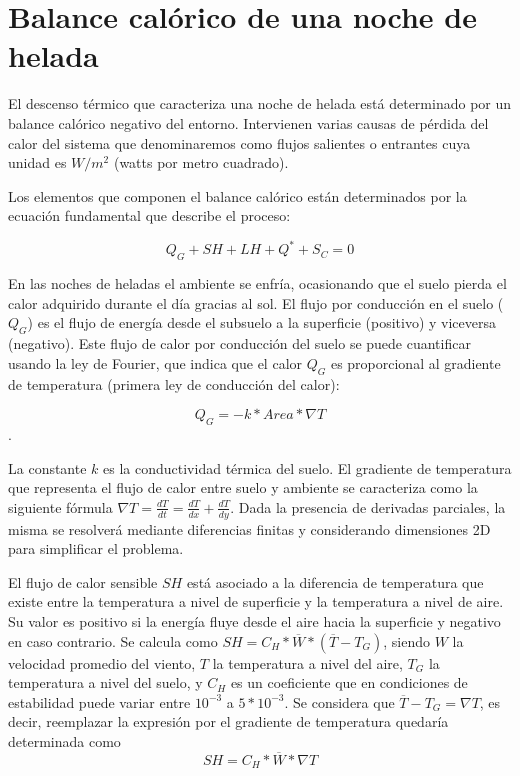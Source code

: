 \documentclass[final,a4paper]{llncs}
\begin{document}
\section{Balance calórico de una noche de helada}

 El descenso térmico que caracteriza una noche de helada está determinado por un balance calórico negativo
 del entorno. Intervienen varias causas de pérdida del calor del sistema que denominaremos como flujos salientes
 o entrantes cuya unidad es $W/m^2$ (watts por metro cuadrado).
 
 Los elementos que componen el balance calórico están determinados por la ecuación fundamental que describe 
 el proceso:
 
$$Q_G + SH + LH + Q^*+S_C=0$$

En las noches de heladas el ambiente se enfría, ocasionando que el suelo pierda el calor adquirido durante
el día gracias al sol. El flujo por conducción en el suelo ($Q_G$) es el flujo de energía desde el subsuelo a la superficie
(positivo) y viceversa (negativo). Este flujo de calor por conducción del suelo se puede cuantificar
usando la ley de Fourier, que indica que el calor $Q_G$ es proporcional al gradiente de temperatura
(primera ley de conducción del calor): 

$$Q_G=-k* Area * \nabla T $$. 

La constante $k$ es la conductividad térmica del suelo.
El gradiente de temperatura que representa el flujo de calor entre suelo y ambiente se caracteriza como la siguiente fórmula 
$\nabla T =\frac{dT}{dt}=\frac{dT}{dx}+\frac{dT}{dy}$. Dada la presencia de derivadas parciales, la misma se resolverá 
mediante diferencias finitas y considerando dimensiones 2D para simplificar el problema.


El flujo de calor sensible $SH$ está asociado a la diferencia de temperatura que existe entre la temperatura
a nivel de superficie y la temperatura a nivel de aire. Su valor es positivo si la energía fluye 
desde el aire hacia la superficie y negativo en caso contrario. Se calcula como 
$SH=C_H*\overline{W}*(\overline{T}-T_G)$, siendo
$W$ la velocidad promedio del viento, $T$ la temperatura a nivel del aire, 
$T_G$ la temperatura a nivel del suelo, y $C_H$ es un coeficiente que en condiciones de estabilidad
puede variar entre $10^{-3}$ a $5*10^{-3}$. Se considera que $\overline{T}-T_G = \nabla T $, es decir,
reemplazar la expresión por el gradiente de temperatura quedaría determinada como
$$SH=C_H*\overline{W}*\nabla T$$
\end{document}
